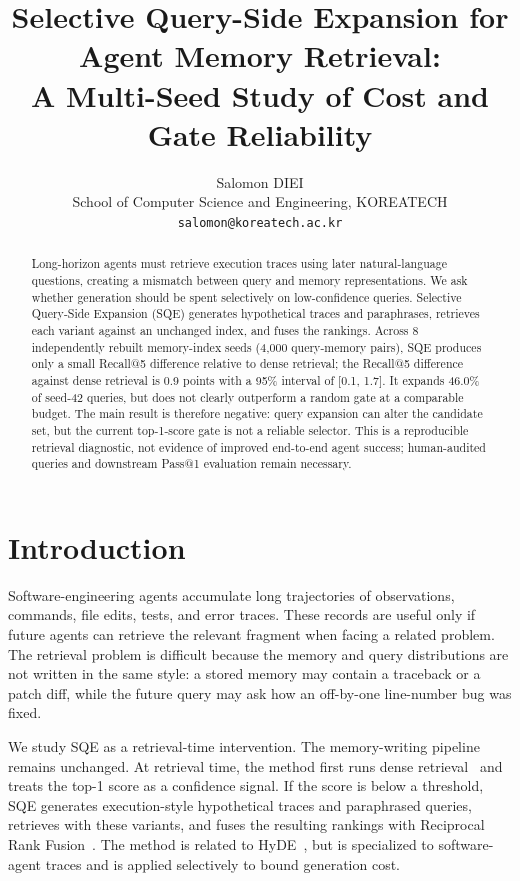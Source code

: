 \documentclass[10pt]{article}
\title{Selective Query-Side Expansion for Agent Memory Retrieval:\\A Multi-Seed Study of Cost and Gate Reliability}
\author{Salomon DIEI\\School of Computer Science and Engineering, KOREATECH\\\texttt{salomon@koreatech.ac.kr}}
\date{}
\begin{document}
\maketitle

\begin{abstract}
Long-horizon agents must retrieve execution traces using later natural-language
questions, creating a mismatch between query and memory representations. We ask
whether generation should be spent selectively on low-confidence queries. Selective
Query-Side Expansion (SQE) generates hypothetical traces and paraphrases, retrieves
each variant against an unchanged index, and fuses the rankings. Across
8 independently rebuilt memory-index seeds (4,000 query-memory pairs), SQE produces only a
small Recall@5 difference relative to dense retrieval; the Recall@5 difference against dense retrieval is 0.9 points with a 95\% interval of [0.1, 1.7]. It
expands 46.0\% of seed-42 queries, but does not clearly outperform a random
gate at a comparable budget. The main result is therefore negative: query expansion
can alter the candidate set, but the current top-1-score gate is not a reliable
selector. This is a reproducible retrieval diagnostic, not evidence of improved
end-to-end agent success; human-audited queries and downstream Pass@1 evaluation
remain necessary.
\end{abstract}

\section{Introduction}
Software-engineering agents accumulate long trajectories of observations,
commands, file edits, tests, and error traces. These records are useful only if
future agents can retrieve the relevant fragment when facing a related problem.
The retrieval problem is difficult because the memory and query distributions are
not written in the same style: a stored memory may contain a traceback or a patch
diff, while the future query may ask how an off-by-one line-number bug was fixed.

We study SQE as a retrieval-time intervention. The memory-writing
pipeline remains unchanged. At retrieval time, the method first runs dense
retrieval~\cite{karpukhin2020dpr} and treats the top-1 score as a confidence
signal. If the score is below a threshold, SQE generates execution-style hypothetical traces and paraphrased
queries, retrieves with these variants, and fuses the resulting rankings with
Reciprocal Rank Fusion~\cite{cormack2009rrf}. The method is related to
HyDE~\cite{gao2023hyde}, but is specialized to software-agent traces and is
applied selectively to bound generation cost.
\end{document}
